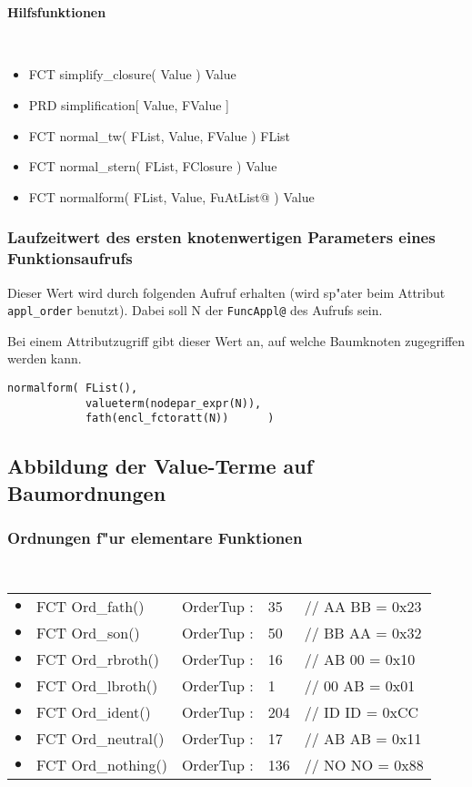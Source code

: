 \paragraph{Hilfsfunktionen}

{\tt
\begin{itemize}
\item FCT simplify\_closure( Value ) Value
\item PRD simplification[ Value, FValue ]
\item FCT normal\_tw( FList, Value, FValue ) FList
\item FCT normal\_stern( FList, FClosure ) Value
\item FCT normalform( FList, Value, FuAtList@ ) Value
\end{itemize}
}

\subsubsection*{Laufzeitwert des ersten knotenwertigen Parameters eines Funktionsaufrufs}

Dieser Wert wird durch folgenden Aufruf erhalten (wird sp"ater beim Attribut
{\tt appl\_order} benutzt). Dabei soll N der {\tt FuncAppl@} des Aufrufs sein.

Bei einem Attributzugriff gibt dieser Wert an, auf welche Baumknoten zugegriffen
werden kann.

\begin{verbatim}
normalform( FList(),
            valueterm(nodepar_expr(N)),
            fath(encl_fctoratt(N))      )
\end{verbatim}


\subsection{Abbildung der Value-Terme auf Baumordnungen}

\subsubsection*{Ordnungen f"ur elementare Funktionen}

{\tt
\begin{tabular}{lllll}
$\bullet$ & FCT Ord\_fath()    & OrderTup : & 35  & // AA BB = 0x23\\
$\bullet$ & FCT Ord\_son()     & OrderTup : & 50  & // BB AA = 0x32\\
$\bullet$ & FCT Ord\_rbroth()  & OrderTup : & 16  & // AB 00 = 0x10\\
$\bullet$ & FCT Ord\_lbroth()  & OrderTup : &  1  & // 00 AB = 0x01\\
$\bullet$ & FCT Ord\_ident()   & OrderTup : &204  & // ID ID = 0xCC\\
$\bullet$ & FCT Ord\_neutral() & OrderTup : & 17  & // AB AB = 0x11\\
$\bullet$ & FCT Ord\_nothing() & OrderTup : &136  & // NO NO = 0x88\\
\end{tabular}
}

